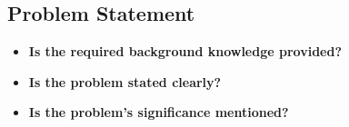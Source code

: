 \subsection{Problem Statement}
\begin{itemize}
\item {\bf Is the required background knowledge provided?}\\
 
\item {\bf Is the problem stated clearly?}\\ 

\item {\bf Is the problem's significance mentioned?}\\ 

\end{itemize}